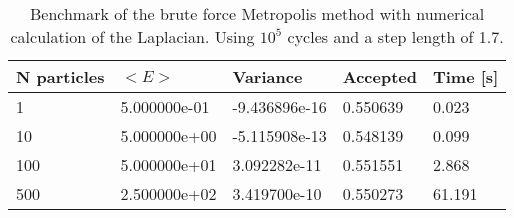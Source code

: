 \begin{table}[h!]
\centering 
\begin{tabular}{|l|l|l|l|l|}
\hline 
N particles & $<E>$ & Variance & Accepted & Time [s]\\ 
 \hline 
1 & 5.000000e-01 & -9.436896e-16 & 0.550639 & 0.023 \\ \hline 
10 & 5.000000e+00 & -5.115908e-13 & 0.548139 & 0.099 \\ \hline 
100 & 5.000000e+01 & 3.092282e-11 & 0.551551 & 2.868 \\ \hline 
500 & 2.500000e+02 & 3.419700e-10 & 0.550273 & 61.191 \\ \hline 
\end{tabular}
\caption{%
	  Benchmark of the brute force Metropolis method with %
	  numerical calculation of the Laplacian. Using $10^5$ %
	  cycles and a step length of 1.7.%
	}
\label{tab:hn1} 
\end{table} 
